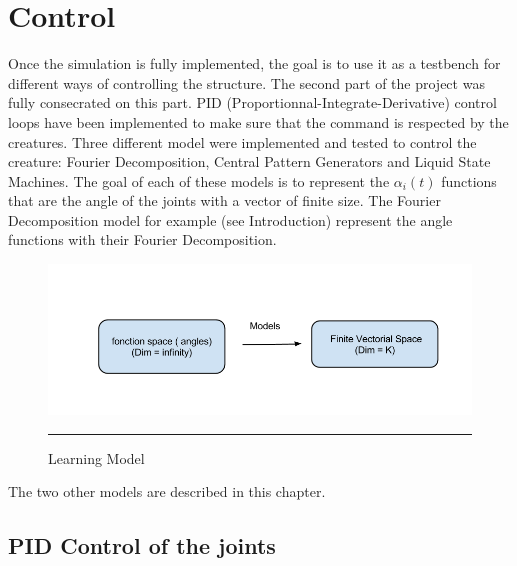 
\chapter{Control} %

\label{Chapter 3} %


%
Once the simulation is fully implemented, the goal is to use it as a testbench for different ways of controlling the structure. The second part of the project was fully consecrated on this part. PID (Proportionnal-Integrate-Derivative) control loops have been implemented to make sure that the command is respected by the creatures. Three different model were implemented and tested to control the creature: Fourier Decomposition, Central Pattern Generators and Liquid State Machines. The goal of each of these models is to represent the $\alpha_i(t)$ functions that are the angle of the joints with a vector of finite size. The Fourier Decomposition model for example (see Introduction) represent the angle functions with their Fourier Decomposition.

\begin{figure}[htbp]
    \centering
    \includegraphics[scale=0.5]{Figures/models.png}
    \rule{35em}{0.5pt}
    \caption[Learning Model]{Learning Model}
    \label{fig:models}
\end{figure}

The two other models are described in this chapter.

\section{PID Control of the joints}

